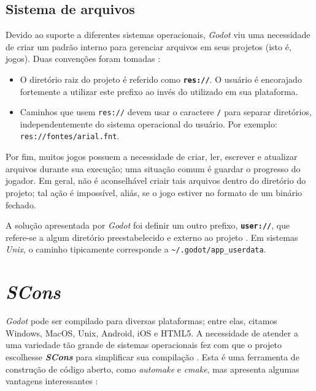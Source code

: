 
\subsection{Sistema de arquivos}
\label{godotFileSystem}

Devido ao suporte a diferentes sistemas operacionais, \textit{Godot} viu uma necessidade de criar um padrão interno para gerenciar arquivos em seus projetos (isto é, jogos). Duas convenções foram tomadas \citep{godotFileSystem}:

\begin{itemize}
\item O diretório raiz do projeto é referido como \textbf{\texttt{res://}}. O usuário é encorajado fortemente a utilizar este prefixo ao invés do utilizado em sua plataforma.

\item Caminhos que usem \texttt{res://} devem usar o caractere \texttt{/} para separar diretórios, independentemente do sistema operacional do usuário. Por exemplo: \texttt{res://fontes/arial.fnt}.
\end{itemize}

Por fim, muitos jogos possuem a necessidade de criar, ler, escrever e atualizar arquivos durante sua execução; uma situação comum é guardar o progresso do jogador. Em geral, não é aconselhável criair tais arquivos dentro do diretório do projeto; tal ação é impossível, aliás, se o jogo estiver no formato de um binário fechado.

A solução apresentada por \textit{Godot} foi definir um outro prefixo, \textbf{\texttt{user://}}, que refere-se a algum diretório preestabelecido e externo ao projeto \citep{godotFileSystem}. Em sistemas \textit{Unix}, o caminho tipicamente corresponde a \texttt{\textasciitilde/.godot/app\_userdata}.


\section{\textit{SCons}}

\textit{Godot} pode ser compilado para diversas plataformas; entre elas, citamos Windows, MacOS, Unix, Android, iOS e HTML5. A necessidade de atender a uma variedade tão grande de sistemas operacionais fez com que o projeto escolhesse \textbf{\textit{SCons}} para simplificar sua compilação \citep{godotScons}. Esta é uma ferramenta de construção de código aberto, como \textit{automake} e \textit{cmake}, mas apresenta algumas vantagens interessantes \citep{scons}:

